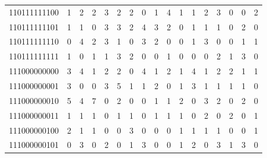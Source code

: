 \documentclass[10pt,a4paper]{article}
\begin{document}
\begin{longtable}{ |c|c|c|c|c|c|c|c|c|c|c|c|c|c|c|c|c| }
    110111111100              & 1                            & 2                                & 2                            & 3                              & 2   & 2   & 0   & 1   & 4   & 1   & 1   & 2   & 3   & 0   & 0   & 2   \\
    110111111101              & 1                            & 1                                & 0                            & 3                              & 3   & 2   & 4   & 3   & 2   & 0   & 1   & 1   & 1   & 0   & 2   & 0   \\
    110111111110              & 0                            & 4                                & 2                            & 3                              & 1   & 0   & 3   & 2   & 0   & 0   & 1   & 3   & 0   & 0   & 1   & 1   \\
    110111111111              & 1                            & 0                                & 1                            & 1                              & 3   & 2   & 0   & 0   & 1   & 0   & 0   & 0   & 2   & 1   & 3   & 0   \\
    111000000000              & 3                            & 4                                & 1                            & 2                              & 2   & 0   & 4   & 1   & 2   & 1   & 4   & 1   & 2   & 2   & 1   & 1   \\
    111000000001              & 3                            & 0                                & 0                            & 3                              & 5   & 1   & 1   & 2   & 0   & 1   & 3   & 1   & 1   & 1   & 1   & 0   \\
    111000000010              & 5                            & 4                                & 7                            & 0                              & 2   & 0   & 0   & 1   & 1   & 2   & 0   & 3   & 2   & 0   & 2   & 0   \\
    111000000011              & 1                            & 1                                & 1                            & 0                              & 1   & 1   & 0   & 1   & 1   & 1   & 0   & 2   & 0   & 2   & 0   & 1   \\
    111000000100              & 2                            & 1                                & 1                            & 0                              & 0   & 3   & 0   & 0   & 0   & 1   & 1   & 1   & 1   & 0   & 0   & 1   \\
    111000000101              & 0                            & 3                                & 0                            & 2                              & 0   & 1   & 3   & 0   & 0   & 1   & 2   & 0   & 3   & 1   & 3   & 0   \\

\end{longtable}
\end{document}
